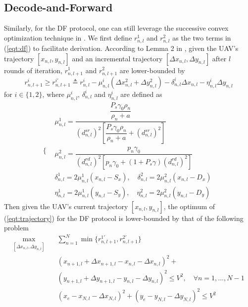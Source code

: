 \documentclass[12pt, draftclsnofoot, onecolumn]{IEEEtran}
\begin{document}
\subsection{Decode-and-Forward}
Similarly, for the DF protocol, one can still leverage the successive convex optimization technique in \cite{7572068}. We first define $r^{1}_{n,l}$ and $r^{2}_{n,l}$ as the two terms in (\ref{eqt:df}) to facilitate derivation. According to Lemma 2 in \cite{7572068}, given the UAV's trajectory $[x_{n,l},y_{n,l}]$ and an incremental trajectory $[\Delta x_{n,l},\Delta y_{n,l}]$ after $l$ rounds of iteration, $r^{1}_{n,l+1}$ and $r^{2}_{n,l+1}$ are lower-bounded by
\begin{equation}\label{eqt:lb_df}
r^{i}_{n,l+1}\geq r^{i\prime}_{n,l+1}\triangleq r^{i}_{n,l}-\mu^{i}_{n,l}(\Delta x^{2}_{n,l}+\Delta y^{2}_{n,l})-\delta^{i}_{n,l}\Delta x_{n,l}-\eta^{i}_{n,l}\Delta y_{n,l}
\end{equation}
for $i\in\{1,2\}$, where $\mu^{i}_{n,l}$, $\delta^{i}_{n,l}$ and $\eta^{i}_{n,l}$ are defined as
\begin{equation}
\left.\{
\begin{aligned}
&\mu^{1}_{n,l}=\dfrac{\dfrac{P_{s}\gamma_{0}\rho_{n}}{\rho_{n}+a}}{(d^{sr}_{n,l})^{2}[\dfrac{P_{s}\gamma_{0}\rho_{n}}{\rho_{n}+a}+(d^{sr}_{n,l})^{2}]}\\
&\mu^{2}_{n,l}=\dfrac{p_{n}\gamma_{0}}{(d^{rd}_{n,l})^{2}[p_{n}\gamma_{0}+(1+P_{s}\gamma)(d^{rd}_{n,l})^{2}]}\\
&\delta^{1}_{n,l}=2\mu^{1}_{n,l}(x_{n,l}-S_{x}),\quad \delta^{2}_{n,l}=2\mu^{2}_{n,l}(x_{n,l}-D_{x})\\
&\eta^{1}_{n,l}=2\mu^{1}_{n,l}(y_{n,l}-S_{y}),\quad \eta^{2}_{n,l}=2\mu^{2}_{n,l}(y_{n,l}-D_{y})
\end{aligned}
\right.
\end{equation}
Then given the UAV's current trajectory $[x_{n,l},y_{n,l}]$, the optimum of (\ref{eqt:trajectory}) for the DF protocol is lower-bounded by that of the following problem
\begin{equation}\label{eqt:problem_lb_df}
\begin{aligned}
\max\limits_{[\Delta x_{n,l},\Delta y_{n,l}]}\quad &\sum\limits _{n=1}^{N}\min\{r^{1\prime}_{n,l+1},r^{2\prime}_{n,l+1}\}\\
&(x_{n+1,l}+\Delta x_{n+1,l}-x_{n,l}-\Delta x_{n,l})^{2}+\\
&(y_{n+1,l}+\Delta y_{n+1,l}-y_{n,l}-\Delta y_{n,l})^{2}\leq V^{2},\quad\forall n=1,...,N-1\\
&(x_{e}-x_{N,l}-\Delta x_{N,l})^{2}+(y_{e}-y_{N,l}-\Delta y_{N,l})^{2}\leq V^{2}
\end{aligned}
\end{equation}
\end{document}
